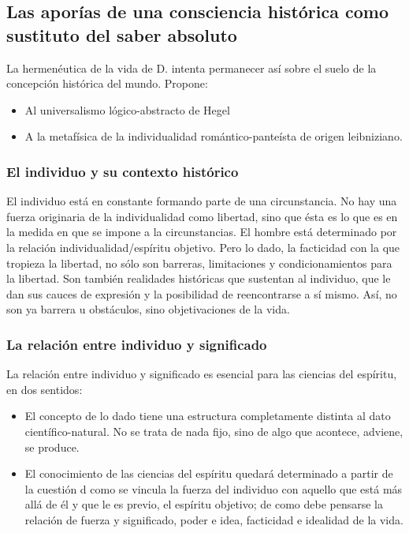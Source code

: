 \documentclass[a4paper, 11pt, twocolumn, spanish]{article}
\begin{document}
\subsection{Las aporías de una consciencia histórica como sustituto del saber absoluto}
\label{sec:org31f3d88}
La hermenéutica de la vida de D. intenta permanecer así sobre el suelo
de la concepción histórica del mundo. Propone:
\begin{itemize}
\item Al universalismo lógico-abstracto de Hegel
\item A la metafísica de la individualidad romántico-panteísta de origen
leibniziano.
\end{itemize}


\subsubsection{El individuo y su contexto histórico}
\label{sec:orge71ada9}
El individuo está en constante formando parte de una circunstancia. No
hay una fuerza originaria de la individualidad como libertad, sino que
ésta es lo que es en la medida en que se impone a la
circunstancias. El hombre está determinado por la relación
individualidad/espíritu objetivo. Pero lo dado, la facticidad con la
que tropieza la libertad, no sólo son barreras, limitaciones y
condicionamientos para la libertad. Son también realidades históricas
que sustentan al individuo, que le dan sus cauces de expresión y la
posibilidad de reencontrarse a sí mismo. Así, no son ya barrera u
obstáculos, sino objetivaciones de la vida.

\subsubsection{La relación entre individuo y significado}
\label{sec:org4424d85}
La relación entre individuo y significado es esencial para las
ciencias del espíritu, en dos sentidos:
\begin{itemize}
\item El concepto de lo dado tiene una estructura completamente distinta
al dato científico-natural. No se trata de nada fijo, sino de algo
que acontece, adviene, se produce.
\item El conocimiento de las ciencias del espíritu quedará determinado a
partir de la cuestión d como se vincula la fuerza del individuo
con aquello que está más allá de él y que le es previo, el
espíritu objetivo; de como debe pensarse la relación de fuerza y
significado, poder e idea, facticidad e idealidad de la vida.
\end{itemize}
\end{document}
